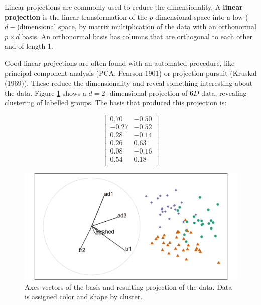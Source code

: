 \documentclass[
  11,
]{article}
\begin{document}
Linear projections are commonly used to reduce the dimensionality. A \textbf{linear projection} is the linear transformation of the \(p\)-dimensional space into a low-(\(d-\))dimensional space, by matrix multiplication of the data with an orthonormal \(p\times d\) basis. An orthonormal basis has columns that are orthogonal to each other and of length 1.

Good linear projections are often found with an automated procedure, like principal component analysis (PCA; Pearson 1901) or projection pursuit (Kruskal (1969)). These reduce the dimensionality and reveal something interesting about the data. Figure \ref{fig:basis} shows a \(d = 2\) -dimensional projection of \(6D\) data, revealing clustering of labelled groups. The basis that produced this projection is:

\begin{equation*}
\left[ \begin{array}{rr}
  0.70 & -0.50 \\
 -0.27 & -0.52 \\
  0.28 & -0.14 \\
  0.26 &  0.63 \\
  0.08 & -0.16 \\
  0.54 &  0.18 \\
\end{array} \right]
\end{equation*}

\begin{figure}[h]

{\centering \includegraphics[width=1\linewidth,]{./figures/basis} 

}

\caption{Axes vectors of the basis and resulting projection of the data. Data is assigned color and shape by cluster.}\label{fig:basis}
\end{figure}
\end{document}
